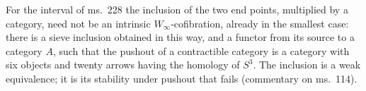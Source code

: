 For the interval of ms.~228 the inclusion of the two end points, multiplied by a category, need not be an intrinsic $W_\infty$-cofibration, already in the smallest case: there is a sieve inclusion obtained in this way, and a functor from its source to a category $A$, such that the pushout of a contractible category is a category with six objects and twenty arrows having the homology of $S^3$. The inclusion is a weak equivalence; it is its stability under pushout that fails (commentary on ms.~114).

